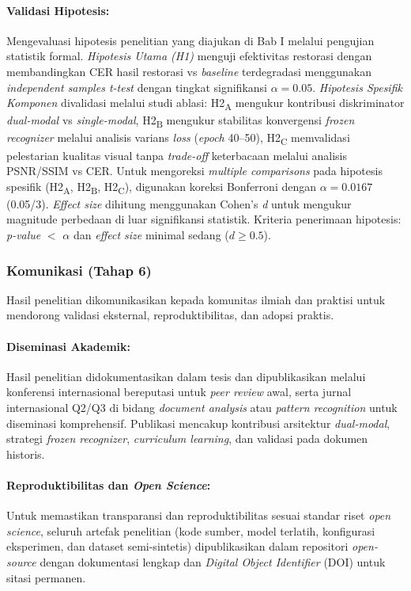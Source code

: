 \documentclass[12pt,a4paper]{book}
\begin{document}
\paragraph{Validasi Hipotesis:}
Mengevaluasi hipotesis penelitian yang diajukan di Bab I melalui pengujian statistik formal. \textit{Hipotesis Utama (H1)} menguji efektivitas restorasi dengan membandingkan CER hasil restorasi vs \textit{baseline} terdegradasi menggunakan \textit{independent samples t-test} dengan tingkat signifikansi $\alpha = 0.05$. \textit{Hipotesis Spesifik Komponen} divalidasi melalui studi ablasi: H2\textsubscript{A} mengukur kontribusi diskriminator \textit{dual-modal} vs \textit{single-modal}, H2\textsubscript{B} mengukur stabilitas konvergensi \textit{frozen recognizer} melalui analisis varians \textit{loss} (\textit{epoch} 40--50), H2\textsubscript{C} memvalidasi pelestarian kualitas visual tanpa \textit{trade-off} keterbacaan melalui analisis PSNR/SSIM vs CER. Untuk mengoreksi \textit{multiple comparisons} pada hipotesis spesifik (H2\textsubscript{A}, H2\textsubscript{B}, H2\textsubscript{C}), digunakan koreksi Bonferroni dengan $\alpha = 0.0167$ (0.05/3). \textit{Effect size} dihitung menggunakan Cohen's \textit{d} untuk mengukur magnitude perbedaan di luar signifikansi statistik. Kriteria penerimaan hipotesis: \textit{p-value} $<$ $\alpha$ dan \textit{effect size} minimal sedang ($d \geq 0.5$).

\subsubsection{Komunikasi (Tahap 6)}
Hasil penelitian dikomunikasikan kepada komunitas ilmiah dan praktisi untuk mendorong validasi eksternal, reproduktibilitas, dan adopsi praktis.

\paragraph{Diseminasi Akademik:}
Hasil penelitian didokumentasikan dalam tesis dan dipublikasikan melalui konferensi internasional bereputasi untuk \textit{peer review} awal, serta jurnal internasional Q2/Q3 di bidang \textit{document analysis} atau \textit{pattern recognition} untuk diseminasi komprehensif. Publikasi mencakup kontribusi arsitektur \textit{dual-modal}, strategi \textit{frozen recognizer}, \textit{curriculum learning}, dan validasi pada dokumen historis.

\paragraph{Reproduktibilitas dan \textit{Open Science}:}
Untuk memastikan transparansi dan reproduktibilitas sesuai standar riset \textit{open science}, seluruh artefak penelitian (kode sumber, model terlatih, konfigurasi eksperimen, dan dataset semi-sintetis) dipublikasikan dalam repositori \textit{open-source} dengan dokumentasi lengkap dan \textit{Digital Object Identifier} (DOI) untuk sitasi permanen.
\end{document}
